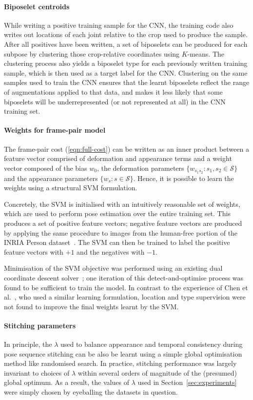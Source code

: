 \documentclass[runningheads]{llncs}
\begin{document}
\paragraph{Biposelet centroids} While writing a positive training sample for the
CNN, the training code also writes out locations of each joint relative to the
crop used to produce the sample. After all positives have been written, a set of
biposelets can be produced for each subpose by clustering those crop-relative
coordinates using $K$-means. The clustering process also yields a biposelet type
for each previously written training sample, which is then used as a target
label for the CNN\@. Clustering on the same samples used to train the CNN ensures
that the learnt biposelets reflect the range of augmentations applied to that
data, and makes it less likely that some biposelets will be underrepresented (or
not represented at all) in the CNN training set.

\paragraph{Weights for frame-pair model} The frame-pair cost
(\ref{eqn:full-cost}) can be written as an inner product between a feature
vector comprised of deformation and appearance terms and a weight vector
composed of the bias $w_0$, the deformation parameters $\{w_{s_1 s_2} : s_1, s_2
\in \mathcal S\}$ and the appearance parameters $\{w_s : s \in \mathcal S\}$.
Hence, it is possible to learn the weights using a structural SVM formulation.

Concretely, the SVM is initialised with an intuitively reasonable set of
weights, which are used to perform pose estimation over the entire training set.
This produces a set of positive feature vectors; negative feature vectors are
produced by applying the same procedure to images from the human-free portion of
the INRIA Person dataset~\cite{dalal2005histograms}. The SVM can then be trained
to label the positive feature vectors with $+1$ and the negatives with $-1$.

Minimisation of the SVM objective was performed using an existing dual
coordinate descent solver~\cite{ramanan2013dual}; one iteration of this
detect-and-optimise process was found to be sufficient to train the model. In
contrast to the experience of Chen et al.~\cite{chen2014articulated}, who used a
similar learning formulation, location and type supervision were not found to
improve the final weights learnt by the SVM.

\paragraph{Stitching parameters} In principle, the $\lambda$ used to balance
appearance and temporal consistency during pose sequence stitching can be also
be learnt using a simple global optimisation method like randomised search. In
practice, stitching performance was largely invariant to choices of $\lambda$
within several orders of magnitude of the (presumed) global optimum. As a
result, the values of $\lambda$ used in Section~\ref{sec:experiments} were
simply chosen by eyeballing the datasets in question.
\end{document}
